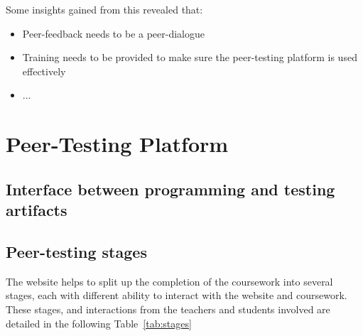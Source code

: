 \documentclass[sigplan,10pt,review]{acmart}\settopmatter{printfolios=true}
\begin{document}
Some insights gained from this revealed that:
\begin{itemize}
\item Peer-feedback needs to be a peer-dialogue
\item Training needs to be provided to make sure the peer-testing
  platform is used effectively
\item ...
\end{itemize}


\section{Peer-Testing Platform}


\subsection{Interface between programming and testing artifacts}

\subsection{Peer-testing stages}
The website helps to split up the completion of the coursework into
several stages, each with different ability to interact with the
website and coursework. These stages, and interactions from the
teachers and students involved are detailed in the following 
Table~\ref{tab:stages}
\end{document}
